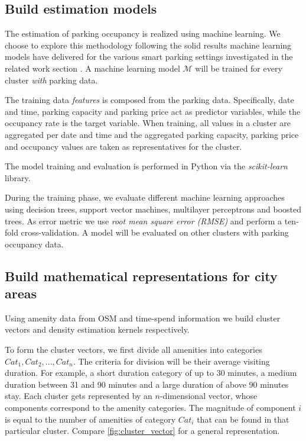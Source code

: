 \documentclass{ws-ijait}
\newcommand{\cmmnt}[1]{\ignorespaces}
\begin{document}
	\subsection{Build estimation models}
	The estimation of parking occupancy is realized using machine learning. We choose to explore this methodology following the solid results machine learning models have delivered for the various smart parking settings investigated in the related work section \cmmnt{\cref{sec:relwork}}. A machine learning model $\mathcal{M}$ will be trained for every cluster \textit{with} parking data.
	
	The training data \textit{features} is composed from the parking data. Specifically, date and time, parking capacity and parking price act as predictor variables, while the occupancy rate is the target variable. When training, all values in a cluster are aggregated per date and time and the aggregated parking capacity, parking price and occupancy values are taken as representatives for the cluster.
	
	The model training and evaluation is performed in Python via the \textit{scikit-learn} library.
	
	During the training phase, we evaluate different machine learning approaches using decision trees, support vector machines, multilayer perceptrons and boosted trees. As error metric we use \textit{root mean square error (RMSE)} and perform a ten-fold cross-validation. A model will be evaluated on other clusters with parking occupancy data.
	
	\subsection{Build mathematical representations for city areas}
	Using amenity data from OSM and time-spend information we build cluster vectors and density estimation kernels respectively.
	
	To form the cluster vectors, we first divide all amenities into categories $Cat_1, Cat_2, ..., Cat_n$. The criteria for division will be their average visiting duration. For example, a short duration category of up to 30 minutes, a medium duration between 31 and 90 minutes and a large duration of above 90 minutes stay. Each cluster gets represented by an $n$-dimensional vector, whose components correspond to the amenity categories. The magnitude of component $i$ is equal to the number of amenities of category $Cat_i$ that can be found in that particular cluster. Compare \cref{fig:cluster_vector} for a general representation.
	
\end{document}
